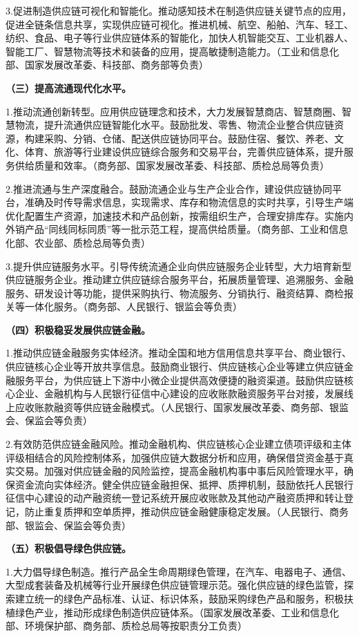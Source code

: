 3.促进制造供应链可视化和智能化。推动感知技术在制造供应链关键节点的应用，促进全链条信息共享，实现供应链可视化。推进机械、航空、船舶、汽车、轻工、纺织、食品、电子等行业供应链体系的智能化，加快人机智能交互、工业机器人、智能工厂、智慧物流等技术和装备的应用，提高敏捷制造能力。（工业和信息化部、国家发展改革委、科技部、商务部等负责）

{ \bf （三）提高流通现代化水平。 }

1.推动流通创新转型。应用供应链理念和技术，大力发展智慧商店、智慧商圈、智慧物流，提升流通供应链智能化水平。鼓励批发、零售、物流企业整合供应链资源，构建采购、分销、仓储、配送供应链协同平台。鼓励住宿、餐饮、养老、文化、体育、旅游等行业建设供应链综合服务和交易平台，完善供应链体系，提升服务供给质量和效率。（商务部、国家发展改革委、科技部、质检总局等负责）

2.推进流通与生产深度融合。鼓励流通企业与生产企业合作，建设供应链协同平台，准确及时传导需求信息，实现需求、库存和物流信息的实时共享，引导生产端优化配置生产资源，加速技术和产品创新，按需组织生产，合理安排库存。实施内外销产品“同线同标同质”等一批示范工程，提高供给质量。（商务部、工业和信息化部、农业部、质检总局等负责）

3.提升供应链服务水平。引导传统流通企业向供应链服务企业转型，大力培育新型供应链服务企业。推动建立供应链综合服务平台，拓展质量管理、追溯服务、金融服务、研发设计等功能，提供采购执行、物流服务、分销执行、融资结算、商检报关等一体化服务。（商务部、人民银行、银监会等负责）

{ \bf （四）积极稳妥发展供应链金融。 }

1.推动供应链金融服务实体经济。推动全国和地方信用信息共享平台、商业银行、供应链核心企业等开放共享信息。鼓励商业银行、供应链核心企业等建立供应链金融服务平台，为供应链上下游中小微企业提供高效便捷的融资渠道。鼓励供应链核心企业、金融机构与人民银行征信中心建设的应收账款融资服务平台对接，发展线上应收账款融资等供应链金融模式。（人民银行、国家发展改革委、商务部、银监会、保监会等负责）

2.有效防范供应链金融风险。推动金融机构、供应链核心企业建立债项评级和主体评级相结合的风险控制体系，加强供应链大数据分析和应用，确保借贷资金基于真实交易。加强对供应链金融的风险监控，提高金融机构事中事后风险管理水平，确保资金流向实体经济。健全供应链金融担保、抵押、质押机制，鼓励依托人民银行征信中心建设的动产融资统一登记系统开展应收账款及其他动产融资质押和转让登记，防止重复质押和空单质押，推动供应链金融健康稳定发展。（人民银行、商务部、银监会、保监会等负责）

{ \bf （五）积极倡导绿色供应链。 }

1.大力倡导绿色制造。推行产品全生命周期绿色管理，在汽车、电器电子、通信、大型成套装备及机械等行业开展绿色供应链管理示范。强化供应链的绿色监管，探索建立统一的绿色产品标准、认证、标识体系，鼓励采购绿色产品和服务，积极扶植绿色产业，推动形成绿色制造供应链体系。（国家发展改革委、工业和信息化部、环境保护部、商务部、质检总局等按职责分工负责）

